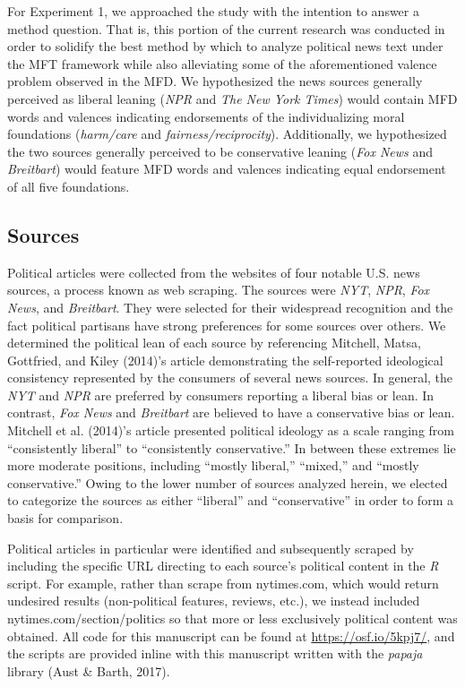 \documentclass[
  english,
  man]{apa6}
\begin{document}
For Experiment 1, we approached the study with the intention to answer a method question. That is, this portion of the current research was conducted in order to solidify the best method by which to analyze political news text under the MFT framework while also alleviating some of the aforementioned valence problem observed in the MFD. We hypothesized the news sources generally perceived as liberal leaning (\emph{NPR} and \emph{The New York Times}) would contain MFD words and valences indicating endorsements of the individualizing moral foundations (\emph{harm/care} and \emph{fairness/reciprocity}). Additionally, we hypothesized the two sources generally perceived to be conservative leaning (\emph{Fox News} and \emph{Breitbart}) would feature MFD words and valences indicating equal endorsement of all five foundations.

\hypertarget{sources}{%
\subsection{Sources}\label{sources}}

Political articles were collected from the websites of four notable U.S. news sources, a process known as web scraping. The sources were \emph{NYT}, \emph{NPR}, \emph{Fox News}, and \emph{Breitbart}. They were selected for their widespread recognition and the fact political partisans have strong preferences for some sources over others. We determined the political lean of each source by referencing Mitchell, Matsa, Gottfried, and Kiley (2014)'s article demonstrating the self-reported ideological consistency represented by the consumers of several news sources. In general, the \emph{NYT} and \emph{NPR} are preferred by consumers reporting a liberal bias or lean. In contrast, \emph{Fox News} and \emph{Breitbart} are believed to have a conservative bias or lean. Mitchell et al. (2014)'s article presented political ideology as a scale ranging from ``consistently liberal'' to ``consistently conservative.'' In between these extremes lie more moderate positions, including ``mostly liberal,'' ``mixed,'' and ``mostly conservative.'' Owing to the lower number of sources analyzed herein, we elected to categorize the sources as either ``liberal'' and ``conservative'' in order to form a basis for comparison.

Political articles in particular were identified and subsequently scraped by including the specific URL directing to each source's political content in the \emph{R} script. For example, rather than scrape from nytimes.com, which would return undesired results (non-political features, reviews, etc.), we instead included nytimes.com/section/politics so that more or less exclusively political content was obtained. All code for this manuscript can be found at \url{https://osf.io/5kpj7/}, and the scripts are provided inline with this manuscript written with the \emph{papaja} library (Aust \& Barth, 2017).
\end{document}
